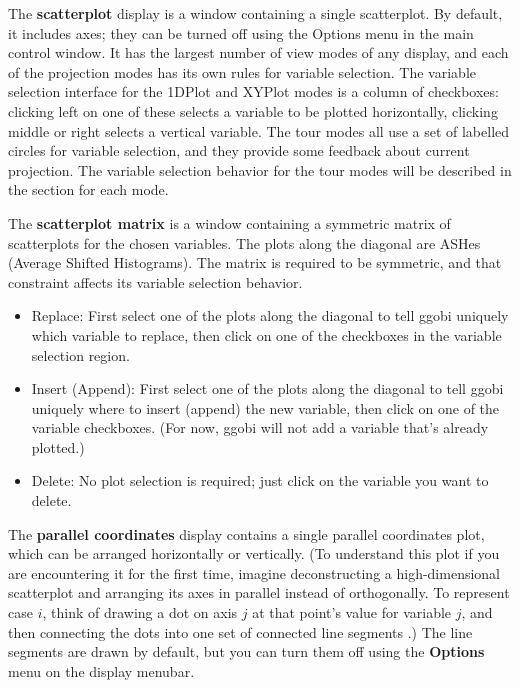 \documentclass[11pt]{article}
\begin{document}
The {\bf scatterplot} display is a window containing a single
scatterplot.  By default, it includes axes; they can be turned off
using the Options menu in the main control window.  It has the
largest number of view modes of any display, and each of the
projection modes has its own rules for variable selection.  The
variable selection interface for the 1DPlot and XYPlot modes is a
column of checkboxes: clicking left on one of these selects a
variable to be plotted horizontally, clicking middle or right selects
a vertical variable.  The tour modes all use a set of labelled
circles for variable selection, and they provide some feedback about
current projection.  The variable selection behavior for the tour
modes will be described in the section for each mode.

The {\bf scatterplot matrix} is a window containing a symmetric matrix
of scatterplots for the chosen variables.  The plots along the diagonal
are ASHes (Average Shifted Histograms).  The matrix is required to be
symmetric, and that constraint affects its variable selection behavior.

\begin{itemize}
\item Replace:  First select one of the plots along the diagonal
  to tell ggobi uniquely which variable to replace, then click on
  one of the checkboxes in the variable selection region.
\item Insert (Append):  First select one of the plots along the
  diagonal to tell ggobi uniquely where to insert (append) the new
  variable, then click on one of the variable checkboxes.  (For now,
  ggobi will not add a variable that's already plotted.)
\item Delete:  No plot selection is required; just click on the
  variable you want to delete.
\end{itemize}

The {\bf parallel coordinates} display contains a single parallel
coordinates plot, which can be arranged horizontally or vertically.
(To understand this plot if you are encountering it for the first
time, imagine deconstructing a high-dimensional scatterplot and
arranging its axes in parallel instead of orthogonally.  To represent
case $i$, think of drawing a dot on axis $j$ at that point's value for
variable $j$, and then connecting the dots into one set of connected
line segments \cite{In85,We90}.)  The line segments are drawn by
default, but you can turn them off using the {\bf Options} menu on the
display menubar.
\end{document}
